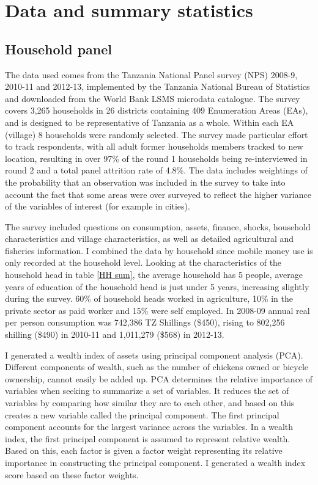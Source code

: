 \newpage
\section{Data and summary statistics}
\subsection{Household panel}
The data used comes from the Tanzania National Panel survey (NPS) 2008-9, 2010-11 and 2012-13, implemented by the Tanzania National Bureau of Statistics and downloaded from the World Bank LSMS microdata catalogue. The survey covers 3,265 households in 26 districts containing 409 Enumeration Areas (EAs), and is designed to be representative of Tanzania as a whole. Within each EA (village) 8 households were randomly selected. The survey made particular effort to track respondents, with all adult former households members tracked to new location, resulting in over 97\% of the round 1 households being re-interviewed in round 2 and a total panel attrition rate of 4.8\%. The data includes weightings of the probability that an observation was included in the survey to take into account the fact that some areas were over surveyed to reflect the higher variance of the variables of interest (for example in cities). 



The survey included questions on consumption, assets, finance, shocks, household characteristics and village characteristics, as well as detailed agricultural and fisheries information. I combined the data by household since mobile money use is only recorded at the household level. Looking at the characteristics of the household head in table \ref{HH sum}, the average household has 5 people, average years of education of the household head is just under 5 years, increasing slightly during the survey. 60\% of household heads worked in agriculture, 10\% in the private sector as paid worker and 15\% were self employed. In 2008-09 annual real per person consumption was 742,386 TZ Shillings (\$450), rising to 802,256 shilling (\$490) in 2010-11 and 1,011,279 (\$568) in 2012-13. 

I generated a wealth index of assets using principal component analysis (PCA). Different components of wealth, such as the number of chickens owned or bicycle ownership, cannot easily be added up. PCA determines the relative importance of variables when seeking to summarize a set of variables. It reduces the set of variables by comparing how similar they are to each other, and based on this creates a new variable called the principal component. The first principal component accounts for the largest variance across the variables. In a wealth index, the first principal component is assumed to represent relative wealth. Based on this, each factor is given a factor weight representing its relative importance in constructing the principal component. I generated a wealth index score based on these factor weights. 

